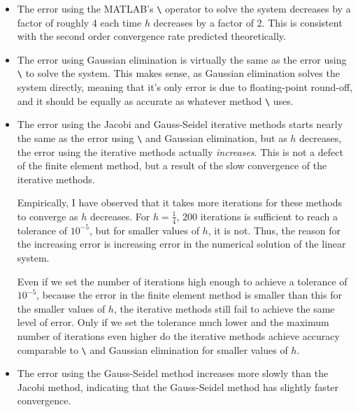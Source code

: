 \documentclass{homework}
\begin{document}
	\begin{itemize}
		\item The error using the MATLAB's \verb*|\| operator to solve the system decreases by a factor of roughly 4 each time $h$ decreases by a factor of 2. This is consistent with the second order convergence rate predicted theoretically.
		
		\item The error using Gaussian elimination is virtually the same as the error using \verb*|\| to solve the system. This makes sense, as Gaussian elimination solves the system directly, meaning that it's only error is due to floating-point round-off, and it should be equally as accurate as whatever method \verb*|\| uses.
		
		\item The error using the Jacobi and Gauss-Seidel iterative methods starts nearly the same as the error using \verb*|\| and Gaussian elimination, but as $h$ decreases, the error using the iterative methods actually \textit{increases}. This is not a defect of the finite element method, but a result of the slow convergence of the iterative methods.
		
		Empirically, I have observed that it takes more iterations for these methods to converge as $h$ decreases. For $h = \frac{1}{4}$, 200 iterations is sufficient to reach a tolerance of $10^{-5}$, but for smaller values of $h$, it is not. Thus, the reason for the increasing error is increasing error in the numerical solution of the linear system.
		
		Even if we set the number of iterations high enough to achieve a tolerance of $10^{-5}$, because the error in the finite element method is smaller than this for the smaller values of $h$, the iterative methods still fail to achieve the same level of error. Only if we set the tolerance much lower and the maximum number of iterations even higher do the iterative methods achieve accuracy comparable to \verb*|\| and Gaussian elimination for smaller values of $h$.
		
		\item The error using the Gauss-Seidel method increases more slowly than the Jacobi method, indicating that the Gauss-Seidel method has slightly faster convergence.
		
	\end{itemize}
	
\end{document}
